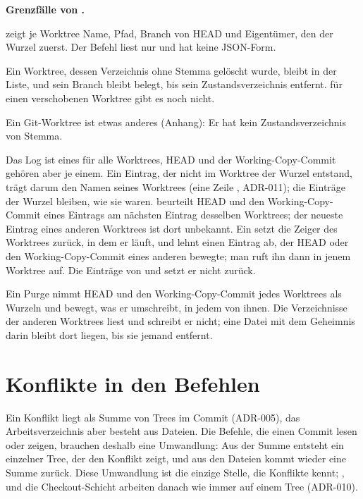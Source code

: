 \startinfobox
{\bf Grenzfälle von .}
\startitemize
\item {} zeigt je Worktree Name, Pfad, Branch von HEAD und Eigentümer, den der
Wurzel zuerst. Der Befehl liest nur und hat keine JSON-Form.
\item Ein Worktree, dessen Verzeichnis ohne Stemma gelöscht wurde, bleibt in der Liste,
und sein Branch bleibt belegt, bis  sein Zustandsverzeichnis entfernt.
 für einen verschobenen Worktree gibt es noch nicht.
\item Ein Git-Worktree ist etwas anderes (Anhang): Er hat kein Zustandsverzeichnis von Stemma.
\item Das Log ist eines für alle Worktrees, HEAD und der Working-Copy-Commit gehören aber je
einem. Ein Eintrag, der nicht im Worktree der Wurzel entstand, trägt darum den Namen seines
Worktrees (eine Zeile , ADR-011); die Einträge der Wurzel bleiben, wie sie waren.
 beurteilt HEAD und den Working-Copy-Commit eines Eintrags am nächsten Eintrag
desselben Worktrees; der neueste Eintrag eines anderen Worktrees ist dort unbekannt.
Ein  setzt die Zeiger des Worktrees zurück, in dem er läuft, und lehnt einen
Eintrag ab, der HEAD oder den Working-Copy-Commit eines anderen bewegte; man ruft ihn dann in
jenem Worktree auf.
Die Einträge von  und  setzt er nicht zurück.
\item Ein Purge nimmt HEAD und den Working-Copy-Commit jedes Worktrees als Wurzeln und bewegt,
was er umschreibt, in jedem von ihnen. Die Verzeichnisse der anderen Worktrees liest und
schreibt er nicht; eine Datei mit dem Geheimnis darin bleibt dort liegen, bis sie jemand entfernt.
\stopitemize
\stopinfobox

\section[sec:conflict-commands]{Konflikte in den Befehlen}

Ein Konflikt liegt als Summe von Trees im Commit (ADR-005), das Arbeitsverzeichnis aber besteht
aus Dateien. Die Befehle, die einen Commit lesen oder zeigen, brauchen deshalb eine Umwandlung:
Aus der Summe entsteht ein einzelner Tree, der den Konflikt zeigt, und aus den Dateien kommt
wieder eine Summe zurück. Diese Umwandlung ist die einzige Stelle, die Konflikte kennt;
,  und die Checkout-Schicht arbeiten danach wie immer auf einem Tree
(ADR-010).

